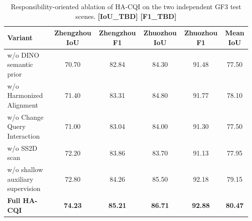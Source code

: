 \begin{table}[htbp]
  \centering
  \caption{Responsibility-oriented ablation of HA-CQI on the two independent GF3 test scenes. \textbf{[IoU\_TBD] [F1\_TBD]}}
  \label{tab:responsibility_ablation}
  \scriptsize
  \setlength{\tabcolsep}{5pt}
  \begin{tabular}{lccccc}
    \toprule
    Variant & Zhengzhou IoU & Zhengzhou F1 & Zhuozhou IoU & Zhuozhou F1 & Mean IoU \\
    \midrule
    w/o DINO semantic prior & 70.70 & 82.84 & 84.30 & 91.48 & 77.50 \\
    w/o Harmonized Alignment & 71.40 & 83.31 & 84.80 & 91.77 & 78.10 \\
    w/o Change Query Interaction & 71.00 & 83.04 & 84.00 & 91.30 & 77.50 \\
    w/o SS2D scan & 72.20 & 83.86 & 83.70 & 91.13 & 77.95 \\
    w/o shallow auxiliary supervision & 72.80 & 84.26 & 85.50 & 92.18 & 79.15 \\
    \textbf{Full HA-CQI} & \textbf{74.23} & \textbf{85.21} & \textbf{86.71} & \textbf{92.88} & \textbf{80.47} \\
    \bottomrule
  \end{tabular}
\end{table}
